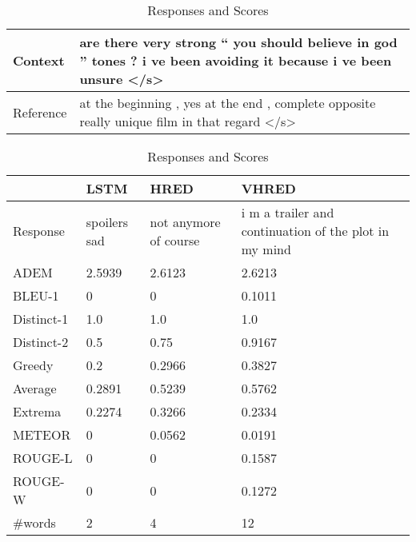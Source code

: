\begin{table}
    \caption{An Example from LSDSCC}
    \centering
    \begin{subtable}{\textwidth}
        \centering
        \caption{Context and Reference}
        \begin{tabular}{|l|p{}|}
            \hline
            Context & are there very strong `` you should believe in god '' tones ? i ve been avoiding it because i ve been unsure </s> \\
            \hline
            Reference & at the beginning , yes at the end , complete opposite really unique film in that regard </s> \\
            \hline
        \end{tabular}
    \end{subtable}
    \begin{subtable}{\textwidth}
        \centering
        \caption{Responses and Scores}
        \begin{tabular}{|l|*{3}{p{}|}}
            \hline
            & LSTM & HRED & VHRED \\
            \hline
            Response & spoilers sad & not anymore of course & i m a trailer and continuation of the plot in my mind \\
            \hline
            ADEM & 2.5939 & 2.6123 & 2.6213 \\
            \hline
            BLEU-1 & 0 & 0 & 0.1011 \\
            \hline
            Distinct-1 & 1.0 & 1.0 & 1.0 \\
            \hline
            Distinct-2 & 0.5 & 0.75 & 0.9167 \\
            \hline
            Greedy & 0.2 & 0.2966 & 0.3827 \\
            \hline
            Average & 0.2891 & 0.5239 & 0.5762 \\
            \hline
            Extrema & 0.2274 & 0.3266 & 0.2334 \\
            \hline
            METEOR & 0 & 0.0562 & 0.0191 \\
            \hline
            ROUGE-L & 0 & 0 & 0.1587 \\
            \hline
            ROUGE-W & 0 & 0 & 0.1272 \\
            \hline
            \#words & 2 & 4 & 12 \\
            \hline
        \end{tabular}
    \end{subtable}
\end{table}